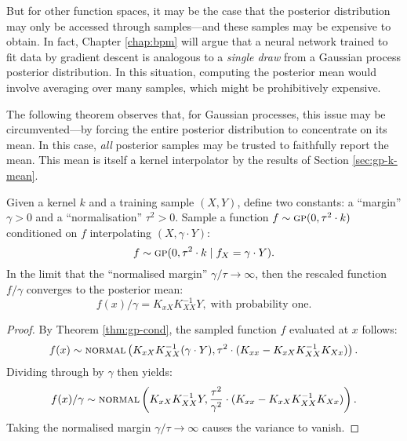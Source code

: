 \begin{refsection}
But for other function spaces, it may be the case that the posterior distribution may only be accessed through samples---and these samples may be expensive to obtain. In fact, Chapter \ref{chap:bpm} will argue that a neural network trained to fit data by gradient descent is analogous to a \textit{single draw} from a Gaussian process posterior distribution. In this situation, computing the posterior mean would involve averaging over many samples, which might be prohibitively expensive.

The following theorem observes that, for Gaussian processes, this issue may be circumvented---by forcing the entire posterior distribution to concentrate on its mean. In this case, \textit{all} posterior samples may be trusted to faithfully report the mean. This mean is itself a kernel interpolator by the results of Section \ref{sec:gp-k-mean}.

\begin{theorem}\label{thm:force-gp} Given a kernel $k$ and a training sample $(X,Y)$, define two constants: a ``margin'' $\gamma>0$ and a ``normalisation'' $\tau^2>0$. Sample a function $f\sim\textsc{gp}(0,\tau^2\cdot k)$ conditioned on $f$ interpolating $(X,\gamma\cdot Y)$:
\begin{equation}
    f\sim\textsc{gp}(0, \tau^2 \cdot k \mid f_X=\gamma\cdot Y ).
\end{equation}
In the limit that the ``normalised margin'' $\gamma / \tau \to \infty$, then the rescaled function $f/\gamma$ converges to the posterior mean:
\begin{equation}
    f(x)/\gamma =K_{xX}K_{XX}^{-1}Y, \; \text{with probability one}.
\end{equation}
\end{theorem}
\begin{proof} By Theorem \ref{thm:gp-cond}, the sampled function $f$ evaluated at $x$ follows:
\begin{equation*}
    f(x) \sim \textsc{normal}\left(K_{xX}K_{XX}^{-1} (\gamma \cdot Y),\tau^2\cdot (K_{xx}-K_{xX}K_{XX}^{-1}K_{Xx})\right).
\end{equation*}
Dividing through by $\gamma$ then yields:
\begin{equation*}
    f(x)/\gamma \sim \textsc{normal}\left(K_{xX}K_{XX}^{-1} Y,\frac{\tau^2}{\gamma^2}\cdot (K_{xx}-K_{xX}K_{XX}^{-1}K_{Xx})\right).
\end{equation*}
Taking the normalised margin $\gamma/\tau \to \infty$ causes the variance to vanish.
\end{proof}


\end{refsection}
